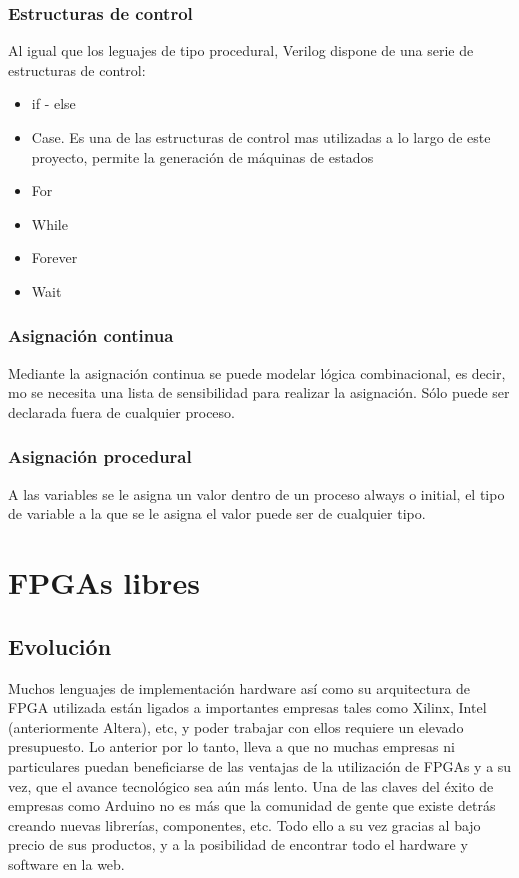 \subsubsection{Estructuras de control}

Al igual que los leguajes de tipo procedural, Verilog dispone de una serie de estructuras de control:

\begin{itemize}
	\item if - else
	\item Case. Es una de las estructuras de control mas utilizadas a lo largo de este proyecto, permite la generación de máquinas de estados
	\item For
	\item While
	\item Forever
	\item Wait
	
\end{itemize}

\subsubsection{Asignación continua}

Mediante la asignación continua se puede modelar lógica combinacional, es decir, mo se necesita una lista de sensibilidad para realizar la asignación. Sólo puede ser declarada fuera de cualquier proceso.

\subsubsection{Asignación procedural}

A las variables se le asigna un valor dentro de un proceso always o initial, el tipo de variable a la que se le asigna el valor puede ser de cualquier tipo.


\section{FPGAs libres}
\subsection{Evolución}
Muchos lenguajes de implementación hardware así como su arquitectura de FPGA utilizada están ligados a importantes empresas tales como Xilinx, Intel (anteriormente Altera), etc, y poder trabajar con ellos requiere un elevado presupuesto. \newline
Lo anterior por lo tanto, lleva a que no muchas empresas ni particulares puedan beneficiarse de las ventajas de la utilización de FPGAs y a su vez, que el avance tecnológico sea aún más lento. Una de las claves del éxito de empresas como Arduino no es más que la comunidad de gente que existe detrás creando nuevas librerías, componentes, etc. Todo ello a su vez gracias al bajo precio de sus productos, y a la posibilidad de encontrar todo el hardware y software en la web. \newline

